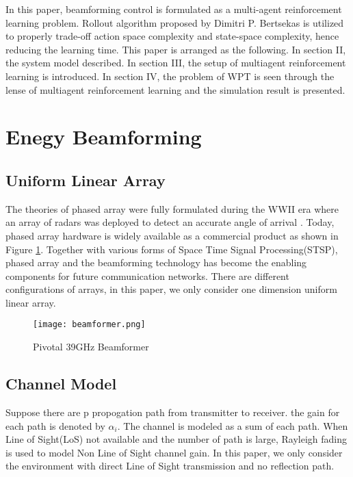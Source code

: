 In this paper, beamforming control is formulated as a multi-agent reinforcement learning problem. Rollout algorithm proposed by Dimitri P. Bertsekas \cite{Bertsekas2019MultiagentRA} is utilized to properly trade-off action space complexity and state-space complexity, hence reducing the learning time. This paper is arranged as the following. In section II, the system model described. In section III, the setup of multiagent reinforcement learning is introduced. In section IV, the problem of WPT is seen through the lense of multiagent reinforcement learning and the simulation result is presented.


\section{Enegy Beamforming}
\subsection{Uniform Linear Array}
The theories of phased array were fully formulated during the WWII era where an array of radars was deployed to detect an accurate angle of arrival \cite{5237174}. Today, phased array hardware is widely available as a commercial product as shown in Figure \ref{fig:pivotal}. Together with various forms of Space Time Signal Processing(STSP), phased array and the beamforming technology has become the enabling components for future communication networks. There are different configurations of arrays, in this paper, we only consider one dimension uniform linear array.

\begin{figure}
\centering
\texttt{[image: beamformer.png]}
\caption{Pivotal 39GHz Beamformer}
\label{fig:pivotal}
\end{figure}
\subsection{Channel Model}

Suppose there are p propogation path from transmitter to receiver. the gain for each path is denoted by $\alpha_i$. The channel is modeled as a sum of each path. When Line of Sight(LoS) not available and the number of path is large, Rayleigh fading is used to model Non Line of Sight channel gain. In this paper, we only consider the environment with direct Line of Sight transmission and no reflection path.

